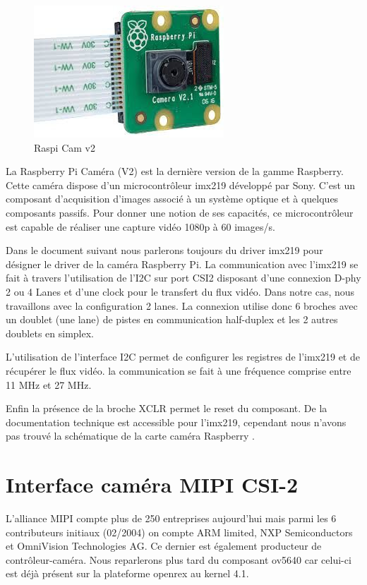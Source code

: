 \begin{figure}[!htb]
    \centering
    \includegraphics[trim={0cm 0cm 0cm 0cm},clip,scale=0.4]{Figures/camrpi.png}
    \decoRule
    \caption{Raspi Cam v2} \label{fig:camrpi}
\end{figure}

La Raspberry Pi Caméra (V2) est la dernière version de la gamme Raspberry. Cette
caméra dispose d’un microcontrôleur imx219 développé par Sony. C’est un composant
d’acquisition d’images associé à un système optique et à quelques composants passifs.
Pour donner une notion de ses capacités, ce microcontrôleur est capable de réaliser une
capture vidéo 1080p à 60 images/s. \medskip

Dans le document suivant nous parlerons toujours du driver imx219 pour désigner le driver
de la caméra Raspberry Pi. La communication avec l’imx219 se fait à travers l’utilisation
de l’I2C sur port CSI2 disposant d’une connexion D-phy 2 ou 4 Lanes et d’une clock pour
le transfert du flux vidéo. Dans notre cas, nous travaillons avec la configuration 2 lanes. La
connexion utilise donc 6 broches avec un doublet (une lane) de pistes en communication
half-duplex et les 2 autres doublets en simplex.\medskip

L’utilisation de l’interface I2C permet de configurer les registres de l’imx219 et de
récupérer le flux vidéo. la communication se fait à une fréquence comprise entre 11 MHz
et 27 MHz.\medskip

Enfin la présence de la broche XCLR permet le reset du composant.
De la documentation technique est accessible pour l’imx219, cependant nous n’avons pas
trouvé la schématique de la carte caméra Raspberry .

\section{Interface caméra MIPI CSI-2}

L’alliance MIPI compte plus de 250 entreprises aujourd’hui mais parmi les 6 contributeurs
initiaux (02/2004) on compte ARM limited, NXP Semiconductors et OmniVision
Technologies AG. Ce dernier est également producteur de contrôleur-caméra. Nous
reparlerons plus tard du composant ov5640 car celui-ci est déjà présent sur la plateforme
openrex au kernel 4.1. \medskip

